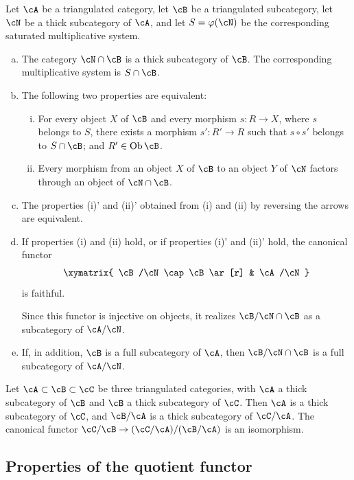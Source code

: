 \documentclass[oneside]{book}
\begin{document}
\begin{theorem}\label{VIII:2-4-2}
Let $\cA$ be a triangulated category, let $\cB$ be a triangulated
subcategory, let $\cN$ be a thick subcategory of $\cA$, and let
$S=\varphi(\cN)$ be the corresponding saturated multiplicative system.
\begin{enumerate}[(a)]
  \item The category $\cN\cap\cB$ is a thick subcategory of $\cB$. The
    corresponding multiplicative system is $S\cap \cB$.
  \item The following two properties are equivalent:
    \begin{enumerate}[(i)]
      \item For every object $X$ of $\cB$ and every morphism $s:R\to X$,
        where $s$ belongs to $S$, there exists a morphism $s':R'\to R$ such
        that $s\circ s'$ belongs to $S\cap \cB$; and
        $R'\in\operatorname{Ob}\cB$.
      \item Every morphism from an object $X$ of $\cB$ to an object $Y$ of
        $\cN$ factors through an object of $\cN\cap \cB$.
    \end{enumerate}
  \item The properties (i)' and (ii)' obtained from (i) and (ii) by
    reversing the arrows are equivalent.
  \item If properties (i) and (ii) hold, or if properties (i)' and (ii)'
    hold, the canonical functor
    \[\xymatrix{
      \cB/\cN\cap \cB \ar[r] & \cA/\cN
    }\]
    is faithful.

    Since this functor is injective on objects, it realizes
    $\cB/\cN\cap\cB$ as a subcategory of $\cA/\cN$.
  \item If, in addition, $\cB$ is a full subcategory of $\cA$, then
    $\cB/\cN\cap \cB$ is a full subcategory of $\cA/\cN$.
\end{enumerate}
\end{theorem}

\begin{corollary}\label{VIII:2-4-3}
Let $\cA\subset \cB\subset \cC$ be three triangulated categories, with
$\cA$ a thick subcategory of $\cB$ and $\cB$ a thick subcategory of
$\cC$. Then $\cA$ is a thick subcategory of $\cC$, and $\cB/\cA$ is a
thick subcategory of $\cC/\cA$. The canonical functor
$\cC/\cB \to (\cC/\cA)/(\cB/\cA)$ is an isomorphism.
\end{corollary}

\subsection{Properties of the quotient functor}\label{VIII:2-5}
\end{document}
